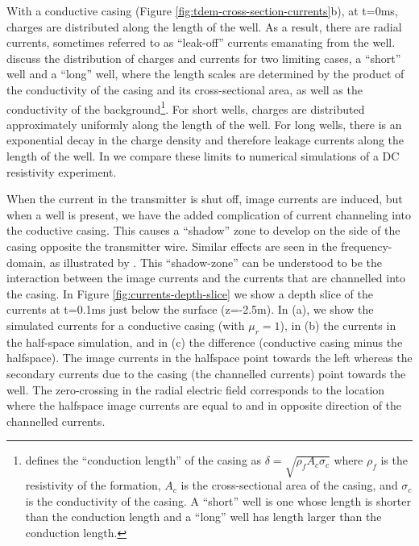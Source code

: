 \documentclass[onecolumn, extra, mreferee]{gji}
\begin{document}


With a conductive casing (Figure \ref{fig:tdem-cross-section-currents}b), at t=0ms, charges are distributed along the length of the well. As a result, there are radial currents, sometimes referred to as ``leak-off'' currents emanating from the well. \cite{kaufman_transmission-line_1993} discuss the distribution of charges and currents for two limiting cases, a ``short'' well and a ``long'' well, where the length scales are determined by the product of the conductivity of the casing and its cross-sectional area, as well as the conductivity of the background\footnote{\cite{schenkel_electrical_1994} defines the ``conduction length'' of the casing as $\delta = \sqrt{\rho_f A_c \sigma_c}$ where $\rho_f$ is the resistivity of the formation, $A_c$ is the cross-sectional area of the casing, and $\sigma_c$ is the conductivity of the casing. A ``short'' well is one whose length is shorter than the conduction length and a ``long'' well has length larger than the conduction length. }. For short wells, charges are distributed approximately uniformly along the length of the well. For long wells, there is an exponential decay in the charge density and therefore leakage currents along the length of the well. In \cite{heagy_modeling_2019} we compare these limits to numerical simulations of a DC resistivity experiment.

When the current in the transmitter is shut off, image currents are induced, but when a well is present, we have the added complication of current channeling into the coductive casing. This causes a ``shadow'' zone to develop on the side of the casing opposite the transmitter wire. Similar effects are seen in the frequency-domain, as illustrated by \cite{wilt_casing_2020}. This ``shadow-zone'' can be understood to be the interaction between the image currents and the currents that are channelled into the casing. In Figure \ref{fig:currents-depth-slice} we show a depth slice of the currents at t=0.1ms just below the surface (z=-2.5m). In (a), we show the simulated currents for a conductive casing (with $\mu_r = 1$), in (b) the currents in the half-space simulation, and in (c) the difference (conductive casing minus the halfspace). The image currents in the halfspace point towards the left whereas the secondary currents due to the casing (the channelled currents) point towards the well. The zero-crossing in the radial electric field corresponds to the location where the halfspace image currents are equal to and in opposite direction of the channelled currents.
\end{document}
